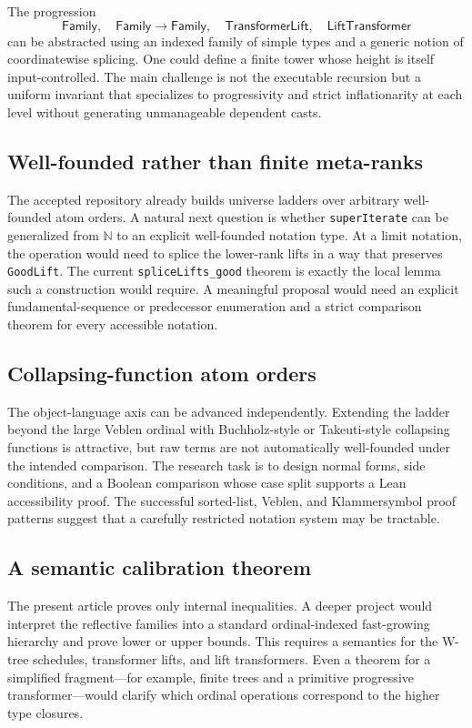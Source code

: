 \documentclass[11pt]{article}
\theoremstyle{definition}
\theoremstyle{remark}
\newcommand{\N}{\mathbb{N}}
\newcommand{\Family}{\mathsf{Family}}
\newcommand{\TLift}{\mathsf{TransformerLift}}
\newcommand{\LLift}{\mathsf{LiftTransformer}}
\newcommand{\leanname}[1]{\nolinkurl{#1}}
\begin{document}
The progression
\[
 \Family,
 \quad \Family\to\Family,
 \quad \TLift,
 \quad \LLift
\]
can be abstracted using an indexed family of simple types and a generic notion
of coordinatewise splicing.  One could define a finite tower whose height is
itself input-controlled.  The main challenge is not the executable recursion
but a uniform invariant that specializes to progressivity and strict
inflationarity at each level without generating unmanageable dependent casts.

\subsection{Well-founded rather than finite meta-ranks}

The accepted repository already builds universe ladders over arbitrary
well-founded atom orders.  A natural next question is whether
\leanname{superIterate} can be generalized from $\N$ to an explicit
well-founded notation type.  At a limit notation, the operation would need to
splice the lower-rank lifts in a way that preserves \leanname{GoodLift}.  The
current \leanname{spliceLifts_good} theorem is exactly the local lemma such a
construction would require.  A meaningful proposal would need an explicit
fundamental-sequence or predecessor enumeration and a strict comparison theorem
for every accessible notation.

\subsection{Collapsing-function atom orders}

The object-language axis can be advanced independently.  Extending the ladder
beyond the large Veblen ordinal with Buchholz-style or Takeuti-style collapsing
functions is attractive, but raw terms are not automatically well-founded
under the intended comparison.  The research task is to design normal forms,
side conditions, and a Boolean comparison whose case split supports a Lean
accessibility proof.  The successful sorted-list, Veblen, and Klammersymbol
proof patterns suggest that a carefully restricted notation system may be
tractable.

\subsection{A semantic calibration theorem}

The present article proves only internal inequalities.  A deeper project would
interpret the reflective families into a standard ordinal-indexed fast-growing
hierarchy and prove lower or upper bounds.  This requires a semantics for the
W-tree schedules, transformer lifts, and lift transformers.  Even a theorem for
a simplified fragment---for example, finite trees and a primitive progressive
transformer---would clarify which ordinal operations correspond to the higher
type closures.
\end{document}
